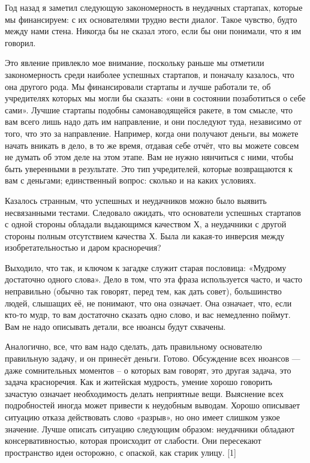 \documentclass[ebook,12pt,oneside,openany]{memoir}
\date{}
\begin{document}
\maketitle

Год назад я заметил следующую закономерность в неудачных стартапах,
которые мы финансируем: с их основателями трудно вести диалог. Такое
чувство, будто между нами стена. Никогда бы не сказал этого, если бы
они понимали, что я им говорил.

Это явление привлекло мое внимание, поскольку раньше мы отметили
закономерность среди наиболее успешных стартапов, и поначалу казалось,
что она другого рода. Мы финансировали стартапы и лучше работали те,
об учредителях которых мы могли бы сказать: «они в состоянии
позаботиться о себе сами». Лучшие стартапы подобны самонаводящейся
ракете, в том смысле, что вам всего лишь надо дать им направление, и
они последуют туда, независимо от того, что это за направление.
Например, когда они получают деньги, вы можете начать вникать в дело,
в то же время, отдавая себе отчёт, что вы можете совсем не думать об
этом деле на этом этапе. Вам не нужно нянчиться с ними, чтобы быть
уверенными в результате. Это тип учредителей, которые возвращаются к
вам с деньгами; единственный вопрос: сколько и на каких условиях.

Казалось странным, что успешных и неудачников можно было выявить
несвязанными тестами. Следовало ожидать, что основатели успешных
стартапов с одной стороны обладали выдающимся качеством Х, а
неудачники с другой стороны полным отсутствием качества Х. Была ли
какая-то инверсия между изобретательностью и даром красноречия?

Выходило, что так, и ключом к загадке служит старая пословица:
«Мудрому достаточно одного слова». Дело в том, что эта фраза
используется часто, и часто неправильно (обычно так говорят, перед
тем, как дать совет), большинство людей, слышащих её, не понимают, что
она означает. Она означает, что, если кто-то мудр, то вам достаточно
сказать одно слово, и вас немедленно поймут. Вам не надо описывать
детали, все нюансы будут схвачены.

Аналогично, все, что вам надо сделать, дать правильному основателю
правильную задачу, и он принесёт деньги. Готово. Обсуждение всех
нюансов — даже сомнительных моментов – о которых вам говорят, это
другая задача, это задача красноречия. Как и житейская мудрость,
умение хорошо говорить зачастую означает необходимость делать
неприятные вещи. Выяснение всех подробностей иногда может привести к
неудобным выводам. Хорошо описывает ситуацию отказа действовать слово
«разрыв», но оно имеет слишком узкое значение. Лучше описать ситуацию
следующим образом: неудачники обладают консервативностью, которая
происходит от слабости. Они пересекают пространство идеи осторожно, с
опаской, как старик улицу. [1]
\end{document}
